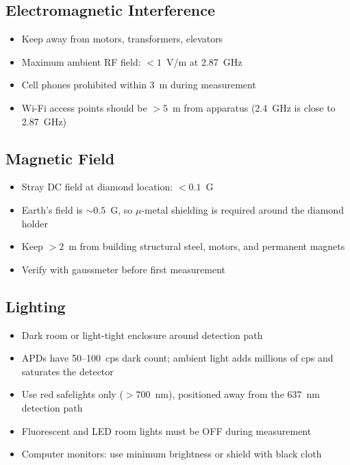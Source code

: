 \documentclass[11pt,a4paper,openany]{book}
\begin{document}
\subsection{Electromagnetic Interference}

\begin{itemize}[nosep]
  \item Keep away from motors, transformers, elevators
  \item Maximum ambient RF field: $< 1$~V/m at 2.87~GHz
  \item Cell phones prohibited within 3~m during measurement
  \item Wi-Fi access points should be $> 5$~m from apparatus (2.4~GHz is close to 2.87~GHz)
\end{itemize}

\subsection{Magnetic Field}

\begin{itemize}[nosep]
  \item Stray DC field at diamond location: $< 0.1$~G
  \item Earth's field is ${\sim}0.5$~G, so $\mu$-metal shielding is required around the diamond holder
  \item Keep $> 2$~m from building structural steel, motors, and permanent magnets
  \item Verify with gaussmeter before first measurement
\end{itemize}

\subsection{Lighting}

\begin{itemize}[nosep]
  \item Dark room or light-tight enclosure around detection path
  \item APDs have 50--100~cps dark count; ambient light adds millions of cps and saturates the detector
  \item Use red safelights only ($> 700$~nm), positioned away from the 637~nm detection path
  \item Fluorescent and LED room lights must be OFF during measurement
  \item Computer monitors: use minimum brightness or shield with black cloth
\end{itemize}
\end{document}
